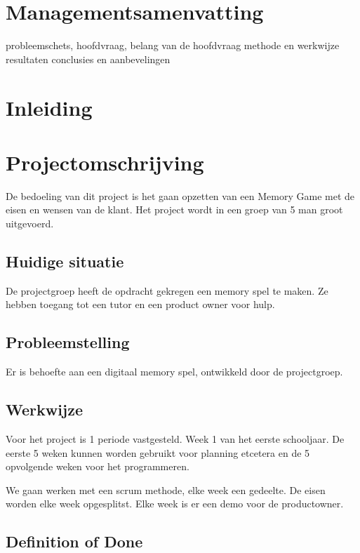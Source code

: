 \documentclass[a4paper,titlepage,11pt]{article}
\begin{document}
\section{Managementsamenvatting}

probleemschets, hoofdvraag, belang van de hoofdvraag
methode en werkwijze
resultaten
conclusies en aanbevelingen

\clearpage

\section{Inleiding}

\clearpage

\section{Projectomschrijving}

De bedoeling van dit project is het gaan opzetten van een Memory Game met de eisen en wensen van de klant. Het project wordt in een groep van 5 man groot uitgevoerd.

\subsection{Huidige situatie}

De projectgroep heeft de opdracht gekregen een memory spel te maken. Ze hebben toegang tot een tutor en een product owner voor hulp.

\subsection{Probleemstelling}

Er is behoefte aan een digitaal memory spel, ontwikkeld door de projectgroep.

\subsection{Werkwijze}

Voor het project is 1 periode vastgesteld. Week 1 van het eerste schooljaar. De eerste 5 weken kunnen worden gebruikt voor planning etcetera en de 5 opvolgende weken voor het programmeren.

We gaan werken met een scrum methode, elke week een gedeelte. De eisen worden elke week opgesplitst. Elke week is er een demo voor de productowner.

\subsection{Definition of Done}
\end{document}
